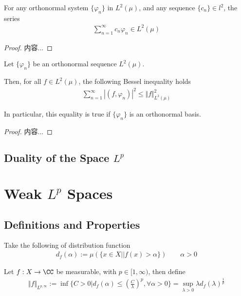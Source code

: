 \documentclass[Total.tex]{subfiles}
\begin{document}
		\begin{theorem}
			For any orthonormal system $\{\varphi_n\}$ in $L^2(\mu)$, and any sequence $\{c_n\}\in l^2$, the series
			\begin{gather*}
				\sum_{n=1}^\infty c_n\varphi_n\in L^2(\mu)
			\end{gather*}
			
		\end{theorem}
		\begin{proof}
			内容...
		\end{proof}
		
		\begin{theorem}
			Let $\{\varphi_n\}$ be an orthonormal sequence $L^2(\mu)$.
			
			Then, for all $f\in L^2(\mu)$, the following Bessel inequality holds
			\begin{gather*}
				\sum_{n=1}^\infty |(f,\varphi_n)|^2\leq \Vert f\Vert^2_{L^2(\mu)}
			\end{gather*}
			
			In particular, this equality is true if $\{\varphi_n\}$ is an orthonormal basis. 
		\end{theorem}
		\begin{proof}
			内容...
		\end{proof}
		\section{Duality of the Space $L^p$}
	\chapter{Weak $L^p$ Spaces}
	
		
		\section{Definitions and Properties}
		\begin{Def}
			Take the following of distribution function
			\begin{gather*}
				d_f(\alpha):=\mu(\{x\in X||f(x)>\alpha\})\qquad \alpha>0
			\end{gather*}
			
			Let $f:X\rightarrow \CC$ be measurable, with $p\in [1,\infty)$, then define
			\begin{gather*}
				\Vert f\Vert_{L^{p,\infty}}:=\inf\{C>0|d_f(\alpha)\leq (\frac{C}{\lambda})^p,\forall \alpha>0\}=\sup_{\lambda>0} \lambda d_f(\lambda)^{\frac{1}{p}}
			\end{gather*}
		\end{Def}
		
\end{document}
